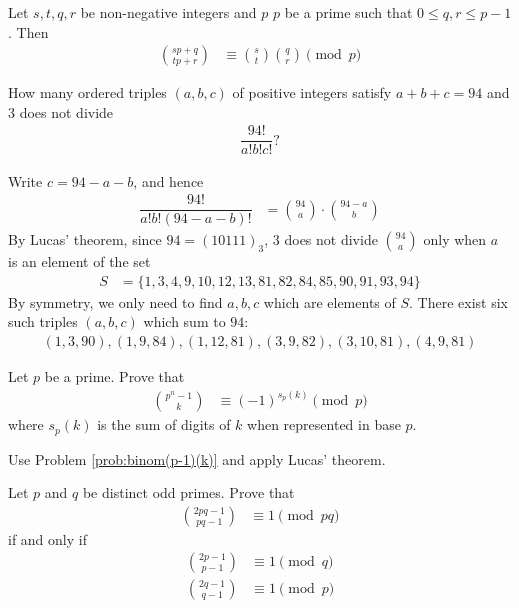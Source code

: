 \documentclass[12pt]{subfile}
\begin{document}
	\begin{corollary}\label{cor:lucas}
		Let $s,t,q,r$ be non-negative integers and $p$ $p$ be a prime such that $0 \leq q,r \leq p-1$. Then
			\begin{align*}
				\binom{sp+q}{tp+r}
					& \equiv \binom{s}{t} \binom{q}{r} \pmod p
			\end{align*}
	\end{corollary}

	\begin{problem}
		How many ordered triples $(a,b,c)$ of positive integers satisfy $a+b+c=94$ and $3$ does not divide
			\begin{align*}
				\dfrac{94!}{a!b!c!}?
			\end{align*}
	\end{problem}

	\begin{solution}
		Write $c=94-a-b$, and hence
			\begin{align*}
				\dfrac{94!}{a!b!(94 - a - b)!}
					& = \binom{94}{a} \cdot \binom{94 - a}{b}
			\end{align*}
		By Lucas' theorem, since $94=(10111)_3$, $3$ does not divide $\binom{94}{a}$ only when $a$ is an element of the set
			\begin{align*}
				 S
				 	& = \{1, 3, 4, 9, 10, 12, 13, 81, 82, 84, 85, 90, 91, 93, 94\}
			\end{align*}
		By symmetry, we only need to find $a,b,c$ which are elements of $S$. There exist six such triples $(a,b,c)$ which sum to $94$:
			\begin{align*}
				(1,3,90), (1, 9, 84), (1, 12, 81), (3, 9, 82), (3, 10, 81), (4,9,81)
			\end{align*}
	\end{solution}

	\begin{problem}
		Let $p$ be a prime. Prove that
			\begin{align*}
				\binom{p^n-1}{k}
					& \equiv (-1)^{s_p(k)}\pmod p
			\end{align*}
		where $s_p(k)$ is the sum of digits of $k$ when represented in base $p$.
	\end{problem}

	\begin{hint}
		Use Problem \ref{prob:binom(p-1)(k)} and apply Lucas' theorem.
	\end{hint}

	\begin{problem}
		Let $p$ and $q$ be distinct odd primes. Prove that
			\begin{align*}
				\binom{2pq-1}{pq-1}
					& \equiv 1\pmod{pq}
			\end{align*}
		if and only if
			\begin{align*}
				\binom{2p-1}{p-1} &\equiv 1 \pmod q\\
				\binom{2q-1}{q-1} &\equiv 1 \pmod p
			\end{align*}
	\end{problem}
\end{document}
